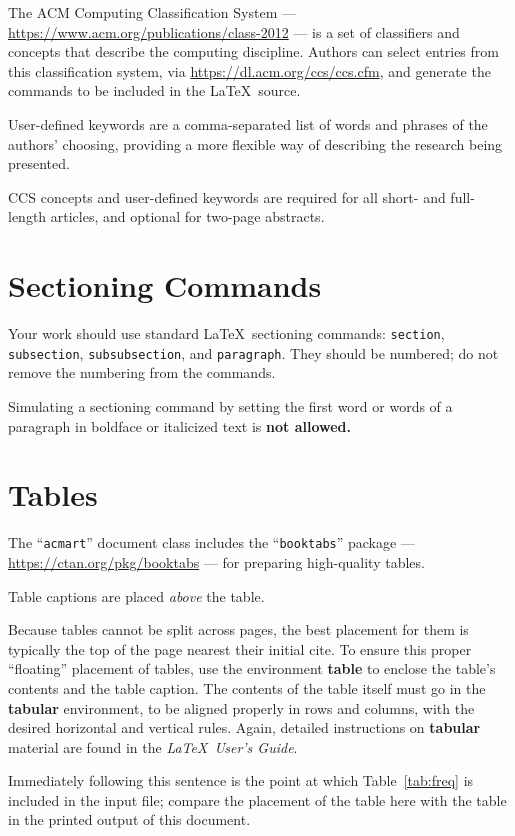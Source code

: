 \documentclass[sigplan,screen,anonymous]{acmart}
\begin{document}
The ACM Computing Classification System --- \url{https://www.acm.org/publications/class-2012} --- is a set of classifiers and concepts that describe the computing discipline. Authors can select entries from this classification system, via \url{https://dl.acm.org/ccs/ccs.cfm}, and generate the commands to be included in the \LaTeX\ source.

User-defined keywords are a comma-separated list of words and phrases of the authors' choosing, providing a more flexible way of describing the research being presented.

CCS concepts and user-defined keywords are required for all short- and full-length articles, and optional for two-page abstracts.

\section{Sectioning Commands}

Your work should use standard \LaTeX\ sectioning commands: \verb|section|, \verb|subsection|, \verb|subsubsection|, and \verb|paragraph|. They should be numbered; do not remove the numbering from the commands.

Simulating a sectioning command by setting the first word or words of a paragraph in boldface or italicized text is {\bf not allowed.}

\section{Tables}

The ``\verb|acmart|'' document class includes the ``\verb|booktabs|'' package --- \url{https://ctan.org/pkg/booktabs} --- for preparing high-quality tables.

Table captions are placed {\it above} the table.

Because tables cannot be split across pages, the best placement for them is typically the top of the page nearest their initial cite.  To ensure this proper ``floating'' placement of tables, use the environment \textbf{table} to enclose the table's contents and the table caption.  The contents of the table itself must go in the \textbf{tabular} environment, to be aligned properly in rows and columns, with the desired horizontal and vertical rules.  Again, detailed instructions on \textbf{tabular} material are found in the \textit{\LaTeX\ User's Guide}.

Immediately following this sentence is the point at which Table~\ref{tab:freq} is included in the input file; compare the placement of the table here with the table in the printed output of this document.
\end{document}

